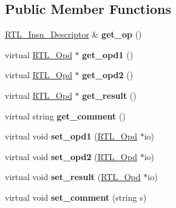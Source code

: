 \subsection*{Public Member Functions}
\begin{DoxyCompactItemize}
\item 
\mbox{\label{classRTL__Stmt_a36b8577a6df8606c6c8c2d8a3b8a0cfa}} 
\hyperlink{classRTL__Insn__Descriptor}{R\+T\+L\+\_\+\+Insn\+\_\+\+Descriptor} \& {\bfseries get\+\_\+op} ()
\item 
\mbox{\label{classRTL__Stmt_a82a8c2d6ff0e61637ba19ec4512a5b93}} 
virtual \hyperlink{classRTL__Opd}{R\+T\+L\+\_\+\+Opd} $\ast$ {\bfseries get\+\_\+opd1} ()
\item 
\mbox{\label{classRTL__Stmt_a98b0318f4f857e1ddeaf9709e2eb660c}} 
virtual \hyperlink{classRTL__Opd}{R\+T\+L\+\_\+\+Opd} $\ast$ {\bfseries get\+\_\+opd2} ()
\item 
\mbox{\label{classRTL__Stmt_a1f1e1aaf71c6e2c6741e752badb09b96}} 
virtual \hyperlink{classRTL__Opd}{R\+T\+L\+\_\+\+Opd} $\ast$ {\bfseries get\+\_\+result} ()
\item 
\mbox{\label{classRTL__Stmt_a220f69e76157883fd2c9e43d07b725f0}} 
virtual string {\bfseries get\+\_\+comment} ()
\item 
\mbox{\label{classRTL__Stmt_a3cdecbdcbb5a41284673d54fcdaa98a1}} 
virtual void {\bfseries set\+\_\+opd1} (\hyperlink{classRTL__Opd}{R\+T\+L\+\_\+\+Opd} $\ast$io)
\item 
\mbox{\label{classRTL__Stmt_a41c887349fb5f53b62faf8ecc0e52656}} 
virtual void {\bfseries set\+\_\+opd2} (\hyperlink{classRTL__Opd}{R\+T\+L\+\_\+\+Opd} $\ast$io)
\item 
\mbox{\label{classRTL__Stmt_a519ef3a181ea3b51c803071e5e812ca1}} 
virtual void {\bfseries set\+\_\+result} (\hyperlink{classRTL__Opd}{R\+T\+L\+\_\+\+Opd} $\ast$io)
\item 
\mbox{\label{classRTL__Stmt_a528b8025511e535026657b85bed2748c}} 
virtual void {\bfseries set\+\_\+comment} (string s)

\end{DoxyCompactItemize}
